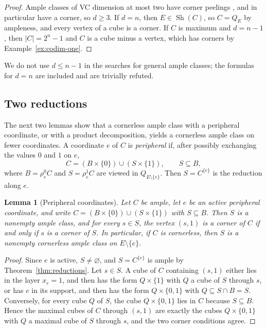 \documentclass[11pt]{article}
\numberwithin{equation}{section}
\newtheorem{lemma}[theorem]{Lemma}
\theoremstyle{definition}
\theoremstyle{remark}
\newcommand{\Sh}{\operatorname{Sh}}
\begin{document}
\begin{proof}
Ample classes of VC dimension at most two have corner peelings
\cite[Proposition~4.11]{ChalopiChepoiMoran22}, and in particular have a
corner, so \(d\ge3\).  If \(d=n\), then \(E\in\Sh(C)\), so \(C=Q_E\) by
ampleness, and every vertex of a cube is a corner.  If \(C\) is maximum and
\(d=n-1\), then \(|C|=2^n-1\) and \(C\) is a cube minus a vertex, which has
corners by Example~\ref{ex:codim-one}.
\end{proof}

We do not use \(d\le n-1\) in the searches for general ample classes; the
formulas for \(d=n\) are included and are trivially refuted.

\subsection{Two reductions}
\label{sec:reductions}

The next two lemmas show that a cornerless ample class with a peripheral
coordinate, or with a product decomposition, yields a cornerless ample class
on fewer coordinates.  A coordinate \(e\) of \(C\) is \emph{peripheral} if,
after possibly exchanging the values \(0\) and \(1\) on \(e\),
\[
 C=(B\times\{0\})\cup(S\times\{1\}),\qquad S\subseteq B,
\]
where \(B=\rho_e^0C\) and \(S=\rho_e^1C\) are viewed in \(Q_{E\setminus\{e\}}\).
Then \(S=C^{\{e\}}\) is the reduction along \(e\).

\begin{lemma}[Peripheral coordinates]
\label{lem:peripheral}
Let \(C\) be ample, let \(e\) be an active peripheral coordinate, and write
\(C=(B\times\{0\})\cup(S\times\{1\})\) with \(S\subseteq B\).  Then \(S\) is a
nonempty ample class, and for every \(s\in S\), the vertex \((s,1)\) is a
corner of \(C\) if and only if \(s\) is a corner of \(S\).  In particular, if
\(C\) is cornerless, then \(S\) is a nonempty cornerless ample class on
\(E\setminus\{e\}\).
\end{lemma}

\begin{proof}
Since \(e\) is active, \(S\neq\varnothing\), and \(S=C^{\{e\}}\) is ample by
Theorem~\ref{thm:reductions}.  Let \(s\in S\).  A cube of \(C\) containing
\((s,1)\) either lies in the layer \(x_e=1\), and then has the form
\(Q\times\{1\}\) with \(Q\) a cube of \(S\) through \(s\), or has \(e\) in its
support, and then has the form \(Q\times\{0,1\}\) with \(Q\subseteq S\cap B=S\).
Conversely, for every cube \(Q\) of \(S\), the cube \(Q\times\{0,1\}\) lies in
\(C\) because \(S\subseteq B\).  Hence the maximal cubes of \(C\) through
\((s,1)\) are exactly the cubes \(Q\times\{0,1\}\) with \(Q\) a maximal cube of
\(S\) through \(s\), and the two corner conditions agree.
\end{proof}
\end{document}
